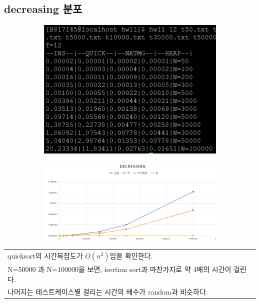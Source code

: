 \documentclass{article}
\begin{document}
\subsection{decreasing 분포}
\begin{figure}[H]
\begin{subfigure}[ht]{.3\linewidth}\centering
\includegraphics[width=.9\linewidth]{decreasing2.PNG}
\end{subfigure}
\begin{subfigure}[ht]{.7\linewidth}\centering
\includegraphics[width=.9\linewidth]{decreasing.PNG}
\end{subfigure}
\end{figure}
\begin{table}[H]
\centering
\begin{tabular}{|m{15cm}|}
\hline
quicksort의 시간복잡도가 $O(n^2)$임을 확인한다.\\
N=50000 과 N=100000을 보면, isertion sort과 마찬가지로 약 4배의 시간이 걸린다.\\
나머지는 테스트케이스별 걸리는 시간의 배수가 random과 비슷하다.\\
\hline
\end{tabular}
\end{table}
\end{document}
